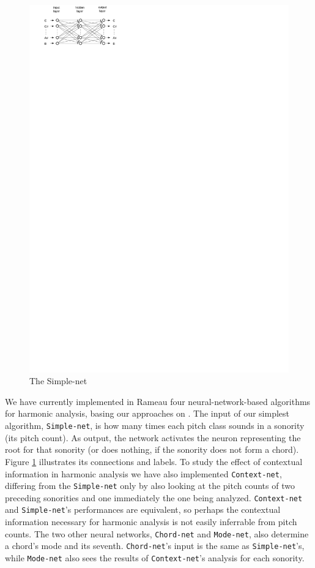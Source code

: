 \documentclass{article}
\begin{document}
\begin{figure}
  \includegraphics[]{neural-networks}
  \caption{The Simple-net}
  \label{fig:simple-net-diagram}
\end{figure}

We have currently implemented in Rameau four neural-network-based
algorithms for harmonic analysis, basing our approaches on
\cite{tsui:harmonic}. The input of our simplest algorithm,
\texttt{Simple-net}, is how many times each pitch class sounds in
a sonority (its pitch count). As output, the network activates the
neuron representing the root for that sonority (or does nothing, if
the sonority does not form a chord). Figure
\ref{fig:simple-net-diagram} illustrates its connections and labels.
To study the effect of contextual information in harmonic analysis we
have also implemented \texttt{Context-net}, differing from the
\texttt{Simple-net} only by also looking at the pitch counts of
two preceding sonorities and one immediately the one being analyzed.
\texttt{Context-net} and \texttt{Simple-net}'s performances are
equivalent, so perhaps the contextual information necessary for
harmonic analysis is not easily inferrable from pitch counts. The two
other neural networks, \texttt{Chord-net} and \texttt{Mode-net}, also
determine a chord's mode and its seventh. \texttt{Chord-net}'s input
is the same as \texttt{Simple-net}'s, while \texttt{Mode-net} also
sees the results of \texttt{Context-net}'s analysis for each sonority.
\end{document}
